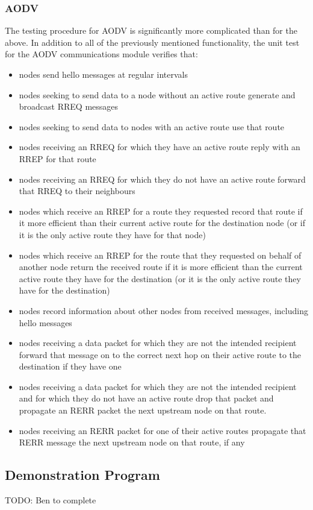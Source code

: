 \subsubsection{AODV}
The testing procedure for AODV is significantly more complicated than for the above. In addition to all of the previously mentioned functionality, the unit test for the AODV communications module verifies that:

\begin{itemize}
\item nodes send hello messages at regular intervals
\item nodes seeking to send data to a node without an active route generate and broadcast RREQ messages
\item nodes seeking to send data to nodes with an active route use that route
\item nodes receiving an RREQ for which they have an active route reply with an RREP for that route
\item nodes receiving an RREQ for which they do not have an active route forward that RREQ to their neighbours
\item nodes which receive an RREP for a route they requested record that route if it more efficient than their current active route for the destination node (or if it is the only active route they have for that node)
\item nodes which receive an RREP for the route that they requested on behalf of another node return the received route if it is more efficient than the current active route they have for the destination (or it is the only active route they have for the destination)
\item nodes record information about other nodes from received messages, including hello messages
\item nodes receiving a data packet for which they are not the intended recipient forward that message on to the correct next hop on their active route to the destination if they have one
\item nodes receiving a data packet for which they are not the intended recipient and for which they do not have an active route drop that packet and propagate an RERR packet the next upstream node on that route.
\item nodes receiving an RERR packet for one of their active routes propagate that RERR message the next upstream node on that route, if any
\end{itemize}

\subsection{Demonstration Program}
TODO: Ben to complete

